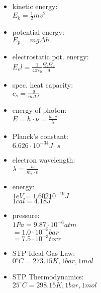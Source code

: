 \begin{minipage}[t]{0.23 \columnwidth}
\begin{itemize}[leftmargin=0.20cm, itemsep=0.05pt]
    \item kinetic energy: \\
    $E_k = \frac{1}{2} m v^2$
    \item potential energy: \\
    $E_p = m g \Delta h$
    \item electrostatic pot. energy:\\
    $E_el = \frac{1}{4\pi \varepsilon_0} \frac{Q_1 Q_2}{d}$
    \item spec. heat capacity:\\
    $c_s = \frac{q}{m \Delta T}$
    \item energy of photon:\\
    $E = h \cdot \nu = \frac{h\cdot c}{\lambda}$
    \item Planck's constant:\\
    $6.626 \cdot 10^{-34} J \cdot s$
\end{itemize}
\end{minipage}
\begin{minipage}[t]{0.24 \columnwidth}
\begin{itemize}[leftmargin=0.20cm, itemsep=0.05pt]
    \item electron wavelength:\\
    $\lambda = \frac{h}{m_e \cdot v}$
    \item energy:\\
    $1 eV = 1.602 10^{-19} J$\\
    $1 cal = 4.18J$
    \item pressure:\\
    $1 Pa = 9.87 \cdot 10^{-6} atm$ \\
    $=1.0 \cdot 10^{-5} bar$\\
    $= 7.5 \cdot 10^{-3} torr$
    \item STP Ideal Gas Law:\\
    $0 ^\circ C = 273.15 K, 1 bar, 1 mol$
    \item STP Thermodynamics:\\
    $25^\circ C =298.15 K,1 bar,1 mol$
\end{itemize}
\end{minipage}